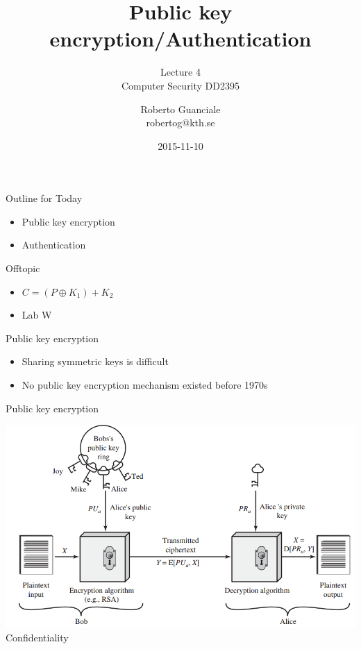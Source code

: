 \documentclass{beamer}
\title{Public key encryption/Authentication}
\subtitle{Lecture 4 \\ Computer Security DD2395}
\author[R. Guanciale]{
  Roberto Guanciale\\
  robertog@kth.se
}
\date{2015-11-10}
\begin{document}
\begin{frame}[plain]
  \titlepage
\end{frame}

\begin{frame}{Outline for Today}
  \begin{itemize}
    \item Public key encryption
    \item Authentication
  \end{itemize}
\end{frame}

\begin{frame}{Offtopic}
  \begin{itemize}
    \item $C = (P \oplus K_1) + K_2$
    \item Lab W
  \end{itemize}
\end{frame}

\begin{frame}{Public key encryption}
  \begin{itemize}
    \item Sharing symmetric keys is difficult
    \item No public key  encryption mechanism existed before 1970s
  \end{itemize}
\end{frame}

\begin{frame}{Public key encryption}
  \begin{center}
    \includegraphics[width=0.8\linewidth]{public1}\\
    Confidentiality
  \end{center}
\end{frame}
\end{document}
